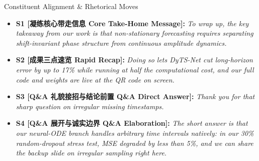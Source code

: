 \begin{TipBox}{Constituent Alignment \& Rhetorical Moves}
\begin{itemize}[leftmargin=1.5em]
  \item \textbf{S1 [凝练核心带走信息 Core Take-Home Message]:} \textit{To wrap up, the key takeaway from our work is that non-stationary forecasting requires separating shift-invariant phase structure from continuous amplitude dynamics.}\par{}
  \item \textbf{S2 [成果三点速览 Rapid Recap]:} \textit{Doing so lets DyTS-Net cut long-horizon error by up to 17\% while running at half the computational cost, and our full code and weights are live at the QR code on screen.}\par{}
  \item \textbf{S3 [Q\&A 礼貌接招与结论前置 Q\&A Direct Answer]:} \textit{Thank you for that sharp question on irregular missing timestamps.}\par{}
  \item \textbf{S4 [Q\&A 展开与诚实边界 Q\&A Elaboration]:} \textit{The short answer is that our neural-ODE branch handles arbitrary time intervals natively: in our 30\% random-dropout stress test, MSE degraded by less than 5\%, and we can share the backup slide on irregular sampling right here.}\par{}
\end{itemize}
\end{TipBox}
\bigskip
